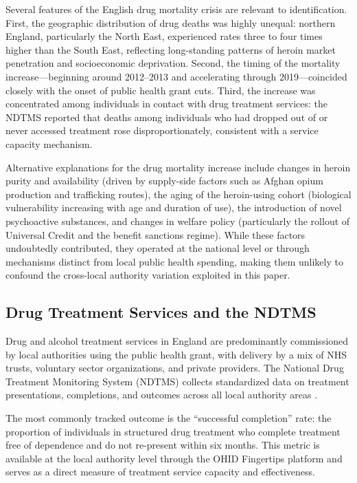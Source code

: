 \documentclass[12pt]{article}
\begin{document}
Several features of the English drug mortality crisis are relevant to identification. First, the geographic distribution of drug deaths was highly unequal: northern England, particularly the North East, experienced rates three to four times higher than the South East, reflecting long-standing patterns of heroin market penetration and socioeconomic deprivation. Second, the timing of the mortality increase---beginning around 2012--2013 and accelerating through 2019---coincided closely with the onset of public health grant cuts. Third, the increase was concentrated among individuals in contact with drug treatment services: the NDTMS reported that deaths among individuals who had dropped out of or never accessed treatment rose disproportionately, consistent with a service capacity mechanism.

Alternative explanations for the drug mortality increase include changes in heroin purity and availability (driven by supply-side factors such as Afghan opium production and trafficking routes), the aging of the heroin-using cohort (biological vulnerability increasing with age and duration of use), the introduction of novel psychoactive substances, and changes in welfare policy (particularly the rollout of Universal Credit and the benefit sanctions regime). While these factors undoubtedly contributed, they operated at the national level or through mechanisms distinct from local public health spending, making them unlikely to confound the cross-local authority variation exploited in this paper.

\subsection{Drug Treatment Services and the NDTMS}

Drug and alcohol treatment services in England are predominantly commissioned by local authorities using the public health grant, with delivery by a mix of NHS trusts, voluntary sector organizations, and private providers. The National Drug Treatment Monitoring System (NDTMS) collects standardized data on treatment presentations, completions, and outcomes across all local authority areas \citep{ndtms2019}.

The most commonly tracked outcome is the ``successful completion'' rate: the proportion of individuals in structured drug treatment who complete treatment free of dependence and do not re-present within six months. This metric is available at the local authority level through the OHID Fingertips platform and serves as a direct measure of treatment service capacity and effectiveness.
\end{document}
